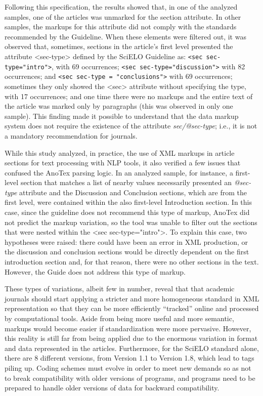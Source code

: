 \documentclass[english]{textolivre}
\begin{document}
Following this specification, the results showed that, in one of the analyzed samples, one of the articles was unmarked for the section attribute. In other samples, the markups for this attribute did not comply with the standards recommended by the Guideline. When these elements were filtered out, it was observed that, sometimes, sections in the article’s first level presented the attribute <sec-type> defined by the SciELO Guideline as: \texttt{<sec sec-type="intro">}, with 69 occurrences; \texttt{<sec sec-type="discussion">} with 82 occurrences; and \texttt{<sec sec-type = "conclusions">} with 69 occurrences; sometimes they only showed the <sec> attribute without specifying the type, with 17 occurrences; and one time there were no markups and the entire text of the article was marked only by paragraphs (this was observed in only one sample). This finding made it possible to understand that the data markup system does not require the existence of the attribute \textit{sec/@sec-type}; i.e., it is not a mandatory recommendation for journals.

While this study analyzed, in practice, the use of XML markups in article sections for text processing with NLP tools, it also verified a few issues that confused the AnoTex parsing logic. In an analyzed sample, for instance, a first-level section that matches a list of nearby values necessarily presented an \textit{@sec-type} attribute and the Discussion and Conclusion sections, which are from the first level, were contained within the also first-level Introduction section. In this case, since the guideline does not recommend this type of markup, AnoTex did not predict the markup variation, so the tool was unable to filter out the sections that were nested within the <sec sec-type="intro">.  To explain this case, two hypotheses were raised: there could have been an error in XML production, or the discussion and conclusion sections would be directly dependent on the first introduction section and, for that reason, there were no other sections in the text. However, the Guide does not address this type of markup.

These types of variations, albeit few in number, reveal that that academic journals should start applying a stricter and more homogeneous standard in XML representation so that they can be more efficiently “tracked” online and processed by computational tools. Aside from being more useful and more semantic, markups would become easier if standardization were more pervasive. However, this reality is still far from being applied due to the enormous variation in format and data represented in the articles. Furthermore, for the SciELO standard alone, there are 8 different versions, from Version 1.1 to Version 1.8, which lead to tags piling up. Coding schemes must evolve in order to meet new demands so as not to break compatibility with older versions of programs, and programs need to be prepared to handle older versions of data for backward compatibility.
\end{document}
